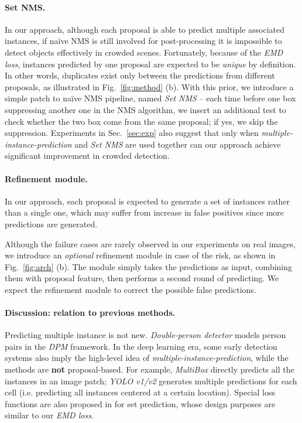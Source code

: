 \documentclass[10pt,twocolumn,letterpaper]{article}
\begin{document}
\paragraph{Set NMS. }
In our approach, although each proposal is able to predict multiple associated instances, if na\"ive NMS is still involved for post-processing it is impossible to detect objects effectively in crowded scenes. Fortunately, because of the \emph{EMD loss}, instances predicted by one proposal are expected to be \emph{unique} by definition. In other words, duplicates exist only between the predictions from different proposals, as illustrated in Fig.~\ref{fig:method} (b). With this prior, we introduce a simple patch to na\"ive NMS pipeline, named \emph{Set NMS} -- each time before one box suppressing another one in the NMS algorithm, we insert an additional test to check whether the two box come from the same proposal; if yes, we skip the suppression. Experiments in Sec.~\ref{sec:exp} also suggest that only when \emph{multiple-instance-prediction} and \emph{Set NMS} are used together can our approach achieve significant improvement in crowded detection. 

\paragraph{Refinement module. }
In our approach, each proposal is expected to generate a set of instances rather than a single one, which may suffer from increase in false positives since more predictions are generated. 

Although the failure cases are rarely observed in our experiments on real images, we introduce an \emph{optional} refinement module in case of the risk, as shown in Fig.~\ref{fig:arch} (b). The module simply takes the predictions as input, combining them with proposal feature, then performs a second round of predicting. We expect the refinement module to correct the possible false predictions. 

\paragraph{Discussion: relation to previous methods.  }
Predicting multiple instance is not new. \emph{Double-person detector} \cite{Tang2014}  models person pairs in the \emph{DPM} \cite{felzenszwalb2009object} framework. In the deep learning era, some early detection systems \cite{yolo,redmon2017yolo9000,szegedy2014scalable,erhan2014scalable} also imply the high-level idea of \emph{multiple-instance-prediction}, while the methods are \textbf{not} proposal-based. For example, \emph{MultiBox} \cite{erhan2014scalable,szegedy2014scalable} directly predicts all the instances in an image patch; \emph{YOLO v1/v2} \cite{yolo,redmon2017yolo9000} generates multiple predictions for each cell (i.e. predicting all instances centered at a certain location). Special loss functions are also proposed in \cite{erhan2014scalable,szegedy2014scalable,yolo,redmon2017yolo9000} for set prediction, whose design purposes are similar to our \emph{EMD loss}. 
\end{document}
